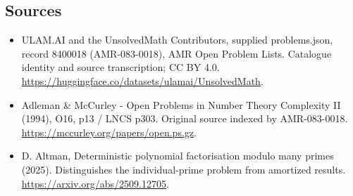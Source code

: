 \documentclass[11pt,a4paper]{article}
\begin{document}
\subsection{Sources}
\begin{itemize}
\item[S1] ULAM.AI and the UnsolvedMath Contributors, supplied problems.json, record 8400018 (AMR-083-0018), AMR Open Problem Lists. Catalogue identity and source transcription; CC BY 4.0.
\url{https://huggingface.co/datasets/ulamai/UnsolvedMath}.
\item[S2] Adleman \& McCurley - Open Problems in Number Theory Complexity II (1994), O16, p13 / LNCS p303. Original source indexed by AMR-083-0018.
\url{https://mccurley.org/papers/open.ps.gz}.
\item[S3] D. Altman, Deterministic polynomial factorisation modulo many primes (2025). Distinguishes the individual-prime problem from amortized results.
\url{https://arxiv.org/abs/2509.12705}.
\end{itemize}
\end{document}
